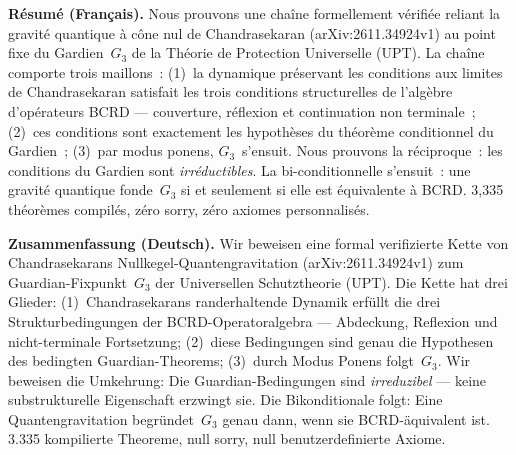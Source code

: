 \documentclass[11pt,a4paper]{article}
\theoremstyle{definition}
\theoremstyle{remark}
\begin{document}
\begin{center}
\parbox{0.85\textwidth}{\small\textbf{R\'{e}sum\'{e} (Fran\c{c}ais).}
Nous prouvons une cha\^{i}ne formellement v\'{e}rifi\'{e}e reliant la gravit\'{e} quantique \`{a} c\^{o}ne nul de Chandrasekaran (arXiv:2611.34924v1) au point fixe du Gardien~$G_3$ de la Th\'{e}orie de Protection Universelle (UPT). La cha\^{i}ne comporte trois maillons~: (1)~la dynamique pr\'{e}servant les conditions aux limites de Chandrasekaran satisfait les trois conditions structurelles de l'alg\`{e}bre d'op\'{e}rateurs BCRD --- couverture, r\'{e}flexion et continuation non terminale~; (2)~ces conditions sont exactement les hypoth\`{e}ses du th\'{e}or\`{e}me conditionnel du Gardien~; (3)~par modus ponens, $G_3$~s'ensuit. Nous prouvons la r\'{e}ciproque~: les conditions du Gardien sont \emph{irr\'{e}ductibles}. La bi-conditionnelle s'ensuit~: une gravit\'{e} quantique fonde~$G_3$ si et seulement si elle est \'{e}quivalente \`{a} BCRD. 3{,}335 th\'{e}or\`{e}mes compil\'{e}s, z\'{e}ro sorry, z\'{e}ro axiomes personnalis\'{e}s.}
\end{center}

\bigskip

\begin{center}
\parbox{0.85\textwidth}{\small\textbf{Zusammenfassung (Deutsch).}
Wir beweisen eine formal verifizierte Kette von Chandrasekarans Nullkegel-Quantengravitation (arXiv:2611.34924v1) zum Guardian-Fixpunkt~$G_3$ der Universellen Schutztheorie (UPT). Die Kette hat drei Glieder: (1)~Chandrasekarans randerhaltende Dynamik erf\"{u}llt die drei Strukturbedingungen der BCRD-Operatoralgebra --- Abdeckung, Reflexion und nicht-terminale Fortsetzung; (2)~diese Bedingungen sind genau die Hypothesen des bedingten Guardian-Theorems; (3)~durch Modus Ponens folgt~$G_3$. Wir beweisen die Umkehrung: Die Guardian-Bedingungen sind \emph{irreduzibel} --- keine substrukturelle Eigenschaft erzwingt sie. Die Bikonditionale folgt: Eine Quantengravitation begr\"{u}ndet~$G_3$ genau dann, wenn sie BCRD-\"{a}quivalent ist. 3.335 kompilierte Theoreme, null sorry, null benutzerdefinierte Axiome.}
\end{center}

\bigskip
\end{document}
